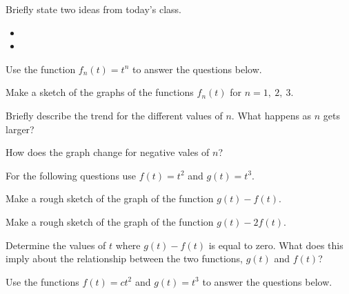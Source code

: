 \postClass

\begin{problem}
\item Briefly state two ideas from today's class.
  \begin{itemize}
  \item
  \item
  \end{itemize}

\item Use the function $f_n(t)=t^n$ to answer the questions below.

  \scalebox{0.7}{}

  \begin{subproblem}
  \item Make a sketch of the graphs of the functions $f_n(t)$ for
    $n=1,~2,~3$.
  \item Briefly describe the trend for the different values of
    $n$. What happens as $n$ gets larger?
    \vfill
  \item How does the graph change for negative vales of  $n$?
    \vfill
  \end{subproblem}

\clearpage

\item For the following questions use $f(t)=t^2$ and $g(t)=t^3$.
  \begin{subproblem}
  \item Make a rough sketch of the graph of the function $g(t)-f(t)$.

    \vfill

  \item Make a rough sketch of the graph of the function $g(t)-2f(t)$.

    \vfill

  \item Determine the values of $t$ where $g(t)-f(t)$ is equal to
    zero. What does this imply about the relationship between the two
    functions, $g(t)$ and $f(t)$?

    \vspace{3em}

  \end{subproblem}

  \clearpage


\item Use the functions $f(t)=c t^2$ and $g(t)=t^3$ to answer the
  questions below.


\end{problem}
